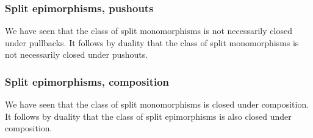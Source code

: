 \subsubsection*{Split epimorphisms, pushouts}

We have seen that the class of split monomorphisms is not necessarily closed under pullbacks.
It follows by duality that the class of split monomorphisms is not necessarily closed under pushouts.



\subsubsection*{Split epimorphisms, composition}

We have seen that the class of split monomorphisms is closed under composition.
It follows by duality that the class of split epimorphisms is also closed under composition.

